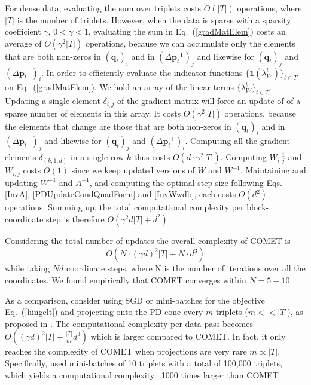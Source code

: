 \documentclass{article} %
\newcommand\mat[1]{{#1}}
\renewcommand\vec[1]{\mathbf{#1}}
\newcommand{\T}{{}^\mathsf{T}}
\newcommand{\W}{\mat{W}}
\newcommand{\invA}{A^{-1}}
\renewcommand{\eqref}[1]{Eq.~(\ref{#1})}
\begin{document}
For dense data, evaluating the sum over triplets costs $O(|T|)$ operations, where $|T|$ is the number of triplets. However, when the data is sparse with a sparsity coefficient $\gamma$, $ 0< \gamma <1 $, evaluating the sum in \eqref{gradMatElem} costs an average of $O(\gamma^2 |T|)$ operations, because we can accumulate only the elements that are both non-zeros in $(\vec{q}_{t})_i$ and in $(\Delta\vec{p}_{t}\T)_j  $ and likewise for $(\vec{q}_{t})_j$ and $(\Delta\vec{p}_{t}\T)_i$.   In order to efficiently evaluate the indicator functions $\{ \textbf{1}(\lambda_{W}^t) \}_{t \in T}$ on \eqref{gradMatElem}. We hold an array of the linear terms $\{\lambda_{W}^t\}_{t \in T}$. Updating a single element $\delta_{i,j}$ of the gradient matrix will force an update of of a sparse number of elements in this array. It costs $O(\gamma^2 |T|)$ operations, because the elements that change are those that are both non-zeros in $(\vec{q}_{t})_i$ and in $(\Delta\vec{p}_{t}\T)_j$ and likewise for $(\vec{q}_{t})_j$ and $(\Delta\vec{p}_{t}\T)_i$.
Computing all the gradient elements $\delta_{(k,1:d)}$ in a single row $k$ thus costs $O(d\cdot \gamma^2 |T|)$.
Computing $\W^{-1}_{i,j}$ and $\W_{i,j}$ costs $O(1)$ since we keep updated versions of $\W$ and $\W^{-1}$.
Maintaining and updating $\W^{-1}$ and $\invA$, and computing the optimal step size following Eqs. \ref{InvA}, \ref{PDUpdateCondQuadForm} and \ref{InvWwdb}, each costs $O(d^2)$ operations. 
Summing up, the total computational complexity per block-coordinate step is therefore $O(\gamma^2 d |T| + d^2)$.

Considering the total number of updates 
the overall complexity of COMET is 
\begin{equation}
O(N \cdot (\gamma d)^2 |T| + N \cdot d^3)
\label{cometComplexity}
\end{equation}
while taking $N \dot d$ coordinate steps, where N is the number of iterations over all the coordinates. We found empirically that COMET converges within $N= 5 - 10$.

As a comparison, consider using SGD or mini-batches for the objective \eqref{hingelt} and projecting onto the PD cone every $m$ triplets ($m << |T|$), as proposed in \citet{OASIS,qian}. The computational complexity per data pass becomes $O((\gamma d)^2 |T| + \frac{|T|}{m} d^3)$ which is larger compared to COMET. In fact, it only reaches the complexity of COMET when projections are very rare $m \propto |T|$. Specifically, \citet{qian} used mini-batches of 10 triplets with a total of 100,000 triplets, which yields a computational complexity ~1000 times larger than COMET
\end{document}
